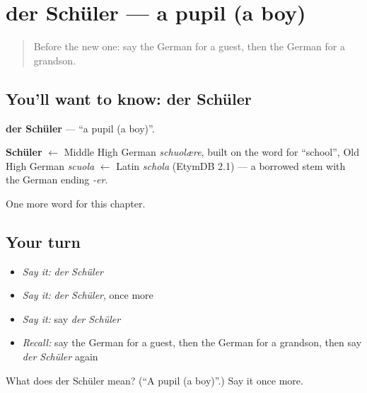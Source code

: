 \section[der Schüler]{der Schüler — a pupil (a boy)}

\label{lesson:GE-C63-schueler}



\begin{quote}
Before the new one: say the German for a guest, then the German for a grandson.
\end{quote}

\subsection*{You'll want to know: der Schüler}
\textbf{der Schüler} — \textquotedblleft{}a pupil (a boy)\textquotedblright{}.

\begin{cousinweb}
\textbf{Schüler} $\leftarrow$ Middle High German \emph{schuolære}, built on the word for \textquotedblleft{}school\textquotedblright{}, Old High German \emph{scuola} $\leftarrow$ Latin \emph{schola} (EtymDB 2.1) — a borrowed stem with the German ending \emph{-er}.
\end{cousinweb}

\begin{grammarlens}[title={What you've built}]
One more word for this chapter.
\end{grammarlens}

\subsection*{Your turn}
\begin{itemize}
\raggedright
  \item \emph{Say it:} \emph{der Schüler}
  \item \emph{Say it:} \emph{der Schüler}, once more
  \item \emph{Say it:} say \emph{der Schüler}
  \item \emph{Recall:} say the German for a guest, then the German for a grandson, then say \emph{der Schüler} again
\end{itemize}

\begin{tcolorbox}[breakable,colback=teal!4,colframe=teal!35!black,title={Before you move on}]
What does der Schüler mean? (\textquotedblleft{}A pupil (a boy)\textquotedblright{}.) Say it once more.
\end{tcolorbox}
